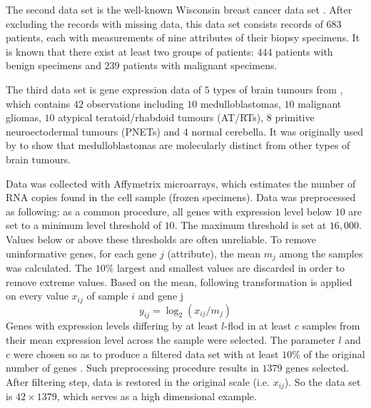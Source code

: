\documentclass[12pt]{article}
\begin{document}
The second data set is the well-known Wisconsin breast cancer data set \citep{mangasarian1990pattern}. After excluding the records with missing data, this data set consists records of $683$ patients, each with measurements of nine attributes of their biopsy specimens. It is known that there exist at least two groups of patients: $444$ patients with benign specimens and $239$ patients with malignant specimens.


The third data set is gene expression data of $5$ types of brain tumours from \cite{de2008clustering}, which contains $42$ observations including $10$ medulloblastomas, $10$ malignant gliomas, $10$ atypical teratoid/rhabdoid tumours (AT/RTs), $8$ primitive neuroectodermal tumours (PNETs) and $4$ normal cerebella. It was originally used by \cite{pomeroy2002prediction} to show that medulloblastomas are molecularly distinct from other types of brain tumours.

Data was collected with Affymetrix microarrays, which estimates the number of RNA copies found in the cell sample (frozen specimens). Data was preprocessed as following: as a common procedure, all genes with expression level below $10$ are set to a minimum level threshold of $10$. The maximum threshold is set at $16,000$. Values below or above these thresholds are often unreliable. To remove uninformative genes, for each gene $j$ (attribute), the mean $m_j$ among the samples was calculated. The $10\%$ largest and smallest values are discarded in order to remove extreme values. Based on the mean, following transformation is applied on every value $x_{ij}$ of sample $i$ and gene j
\[	y_{ij} = \log_2 (x_{ij}/m_j)	\] 
Genes with expression levels differing by at least $l$-flod in at least $c$ samples from their mean expression level across the sample were selected. The parameter $l$ and $c$ were chosen so as to produce a filtered data set with at least $10\%$ of the original number of genes \citep{de2008clustering}. Such preprocessing procedure results in $1379$ genes selected. After filtering step, data is restored in the original scale (i.e. $x_{ij}$). So the data set is $42 \times 1379$, which serves as a high dimensional example.
\end{document}
